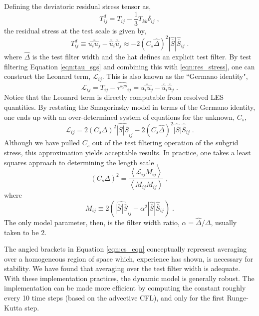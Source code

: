 Defining the deviatoric residual stress tensor as, 
\begin{equation}
T_{ij}^d = T_{ij} - \frac{1}{3} T_{kk}\delta_{ij} \;,
\end{equation}
the residual stress at the test scale is given by,
\begin{equation}\label{eqn:res_stress}
T_{ij}^{d} \equiv \overline{\widehat {u_i u_j}} - \overline{\widehat{u}}_i \overline{\widehat{u}}_j \approx -2(C_s \widehat{\Delta})^2 |\widehat{\overline{S}}| \widehat{\overline{S}}_{ij} \; .
\end{equation}
where $\widehat{\Delta}$ is the test filter width and the hat defines an explicit test filter. By test filtering Equation \ref{eqn:tau_sgs} and combining this with \ref{eqn:res_stress}, one can construct the Leonard term, $\mathcal{L}_{ij}$. This is also known as the ``Germano identity",
\begin{equation}
\mathcal{L}_{ij} = T_{ij} - \widehat{ \tau^{sgs}}_{ij} =  \overline{\widehat {u_i u_j}} - \overline{\widehat{u}}_i \overline{\widehat{u}}_j \; .
\end{equation}
Notice that the Leonard term is directly computable from resolved LES quantities. By restating the Smagorinsky model in terms of the Germano identity, one ends up with an over-determined system of equations for the unknown, $C_s$,
\begin{equation}
\mathcal{L}_{ij} = 2( C_s \Delta)^2 \widehat{ |\overline{S} | \overline{S} }_{ij} - 
   2( C_s \widehat{\Delta})^2 \widehat{ |\overline{S}} | \widehat{\overline{S}}_{ij} \; .
\end{equation}
Although we have pulled $C_s$ out of the test filtering operation of the subgrid stress, this approximation yields acceptable results. In practice, one takes a least squares approach to determining the length scale \cite{Lilly180},
\begin{equation} \label{eqn:cs_eqn}
(C_s \Delta)^2 = \frac{ \left< \mathcal{L}_{ij} M_{ij} \right>}{ \left< M_{ij}M_{ij} \right> } \; ,
\end{equation}
where
\begin{equation}
M_{ij} \equiv 2 \left( \widehat{ | \overline{S} | \overline{S} }_{ij} - \alpha^2 |\widehat{\overline{S}}|\widehat{\overline{S}}_{ij} \right) \; .
\end{equation} 
The only model parameter, then, is the filter width ratio, $\alpha = \widehat{\Delta}/\Delta$, usually taken to be 2.

The angled brackets in Equation \ref{eqn:cs_eqn} conceptually represent averaging over a homogeneous region of space which, experience has shown, is necessary for stability. We have found that averaging over the test filter width is adequate.
With these implementation practices, the dynamic model is generally robust. The implementation can be made more efficient by computing the constant roughly every 10 time steps (based on the advective CFL), and only for the first Runge-Kutta step.


